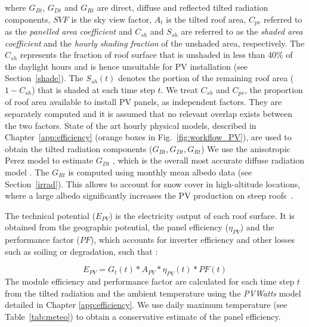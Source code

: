 where $G_{Bt}$, $G_{Dt}$ and $G_{Rt}$ are direct, diffuse and reflected tilted radiation components, $\mathit{SVF}$ is the sky view factor, $A_{t}$ is the tilted roof area, $C_{\mathit{pv}}$ referred to as the \textit{panelled area coefficient} and $C_{sh}$ and $S_{sh}$ are referred to as the \textit{shaded area coefficient} and the \textit{hourly shading fraction} of the unshaded area, respectively.
%
The $C_{sh}$ represents the fraction of roof surface that is unshaded in less than 40\% of the daylight hours and is hence unsuitable for PV installation (see Section~\ref{shade}). The $S_{sh}(t)$ denotes the portion of the remaining roof area ($1 - C_{sh}$) that is shaded at each time step $t$. 
We treat $C_{sh}$ and $C_{\mathit{pv}}$, the proportion of roof area available to install PV panels, as independent factors. They are separately computed and it is assumed that no relevant overlap exists between the two factors. 
%
State of the art hourly physical models, described in Chapter~\ref{app:efficiency} (orange boxes in Fig.~\ref{fig:workflow_PV}), are used to obtain the tilted radiation components ($G_{Bt}, G_{Dt}, G_{Rt}$) 
We use the anisotropic Perez model \cite{perez_modeling_1990} to estimate $G_{Dt}$ , which is the overall most accurate diffuse radiation model \cite{noorian_evaluation_2008, loutzenhiser_empirical_2007}. 
The $G_{Rt}$ is computed using monthly mean albedo data (see Section~\ref{irrad}). This allows to account for snow cover in high-altitude locations, where a large albedo significantly increases the PV production on steep roofs~\cite{kahl_bright_2019}.

The technical potential ($E_{PV}$) is the electricity output of each roof surface. It is obtained from the geographic potential, the panel efficiency ($\eta_{PV}$) and the performance factor ($\mathit{PF}$), which accounts for inverter efficiency and other losses such as soiling or degradation, such that \cite{assouline_large-scale_2018}:

\begin{equation}
\label{eq:pv}
E_{PV} = G_t(t) * A_{PV} * \eta_{PV}(t) * \mathit{PF}(t)
\end{equation}
The module efficiency and performance factor are calculated for each time step $t$ from the tilted radiation and the ambient temperature using the \textit{PVWatts} model~\cite{dobos_pvwatts_2014} detailed in Chapter \ref{app:efficiency}. We use daily maximum temperature (see Table~\ref{tab:meteo}) to obtain a conservative estimate of the panel efficiency. 

